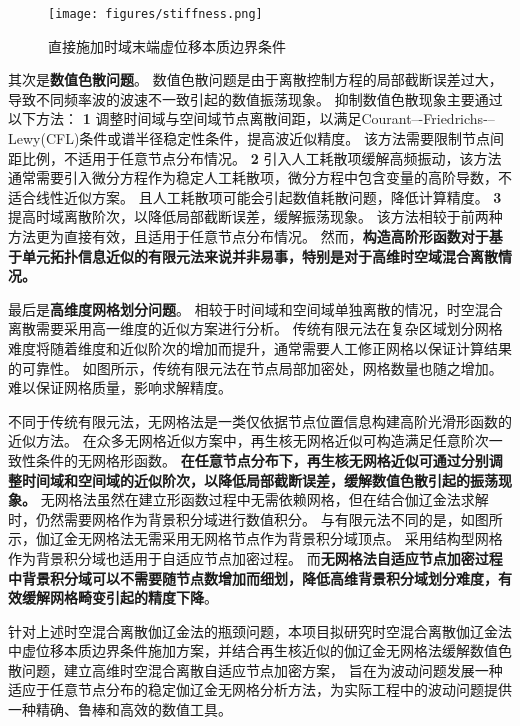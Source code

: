 \begin{figure}[!h]
    \centering 
    \texttt{[image: figures/stiffness.png]}
    \caption{直接施加时域末端虚位移本质边界条件}
    \label{fg:direct}
\end{figure}

其次是\textbf{数值色散问题}。
数值色散问题是由于离散控制方程的局部截断误差过大，导致不同频率波的波速不一致引起的数值振荡现象\cite{zhang2024}。
抑制数值色散现象主要通过以下方法：
\textcircled{\textbf{\small 1}}
调整时间域与空间域节点离散间距，以满足Courant–-Friedrichs-–Lewy(CFL)条件或谱半径稳定性条件，提高波近似精度。
该方法需要限制节点间距比例，不适用于任意节点分布情况。
\textcircled{\textbf{\small 2}}
引入人工耗散项缓解高频振动，该方法通常需要引入微分方程作为稳定人工耗散项，微分方程中包含变量的高阶导数，不适合线性近似方案。
且人工耗散项可能会引起数值耗散问题，降低计算精度。
\textcircled{\textbf{\small 3}}
提高时域离散阶次，以降低局部截断误差，缓解振荡现象。
该方法相较于前两种方法更为直接有效，且适用于任意节点分布情况。
然而，\textbf{构造高阶形函数对于基于单元拓扑信息近似的有限元法来说并非易事，特别是对于高维时空域混合离散情况。}

最后是\textbf{高维度网格划分问题}。
相较于时间域和空间域单独离散的情况，时空混合离散需要采用高一维度的近似方案进行分析。
传统有限元法在复杂区域划分网格难度将随着维度和近似阶次的增加而提升，通常需要人工修正网格以保证计算结果的可靠性。
如图所示，传统有限元法在节点局部加密处，网格数量也随之增加。
难以保证网格质量，影响求解精度。

不同于传统有限元法，无网格法\cite{Zhang2004a}是一类仅依据节点位置信息构建高阶光滑形函数的近似方法。
在众多无网格近似方案中，再生核无网格近似可构造满足任意阶次一致性条件的无网格形函数。
\textbf{在任意节点分布下，再生核无网格近似可通过分别调整时间域和空间域的近似阶次，以降低局部截断误差，缓解数值色散引起的振荡现象。}
无网格法虽然在建立形函数过程中无需依赖网格，但在结合伽辽金法求解时，仍然需要网格作为背景积分域进行数值积分。
与有限元法不同的是，如图所示，伽辽金无网格法无需采用无网格节点作为背景积分域顶点。
采用结构型网格作为背景积分域也适用于自适应节点加密过程。
而\textbf{无网格法自适应节点加密过程中背景积分域可以不需要随节点数增加而细划，降低高维背景积分域划分难度，有效缓解网格畸变引起的精度下降}。

针对上述时空混合离散伽辽金法的瓶颈问题，本项目拟研究时空混合离散伽辽金法中虚位移本质边界条件施加方案，并结合再生核近似的伽辽金无网格法缓解数值色散问题，建立高维时空混合离散自适应节点加密方案，
旨在为波动问题发展一种适应于任意节点分布的稳定伽辽金无网格分析方法，为实际工程中的波动问题提供一种精确、鲁棒和高效的数值工具。

